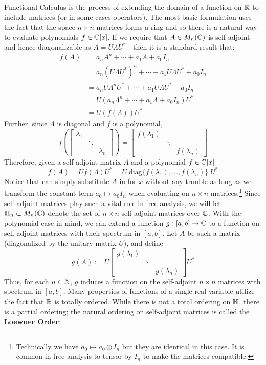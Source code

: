 Functional Calculus is the process of extending the domain of a function
on \(\mathbb{R}\) to include matrices (or in some cases operators). The most basic
formulation uses the fact that the space \(n \times n\) matrices forms a ring
and so there is a natural way to evaluate polynomials \(f \in \mathbb{C} [x]\). If we
require that $A \in M_n(\mathbb{C})$ is self-adjoint---and hence diagonalizable as
$A = U \Lambda U^*$---then it is a standard result that:
\begin{align*}
  f(A) &= a_nA^n + \cdots + a_1A + a_0 I_n \\
  &= a_n \left( U\Lambda U^* \right) ^n + \cdots + a_1 U\Lambda U^* + a_0 I_n \\
  &= a_n U\Lambda^n U^* + \cdots + a_1 U\Lambda U^* + a_0 I_n \\
  &= U \left( a_n\Lambda ^n + \cdots + a_1\Lambda + a_0 I_n \right) U^* \\
  &= U \left( f(\Lambda) \right) U^*
\end{align*}
Further, since \(\Lambda\) is diagonal and $f$ is a polynomial,
\[
  f \left( \begin{bmatrix} \lambda_1 &  &  \\  & \ddots &  \\  &  & \lambda_n \end{bmatrix}  \right)
  = \begin{bmatrix} f(\lambda_1) &  &  \\  & \ddots &  \\  &  & f(\lambda_n) \end{bmatrix}
\]
Therefore, given a self-adjoint matrix \(A\) and a polynomial \(f \in \mathbb{C} [x]\)
\[
  f(A) = Uf(\Lambda)U^* = U \;\text{diag}\{f(\lambda_{1}), \dots , f(\lambda_n)\} \; U^*
\]
Notice that can simply substitute \(A\) in for \(x\) without any trouble as long
as we transform the constant term \(a_0 \mapsto a_0I_n\) when evaluating on
\(n\times n\) matrices.\footnote{Technically we have
  \(a_0 \mapsto a_0 \otimes I_n\) but they are identical in this case. It is common in free
  analysis to tensor by \(I_n\) to make the matrices compatible.}
Since self-adjoint matrices play such a vital role in free analysis, we will let
\(\mathbb{H}_n \subset M_n(\mathbb{C})\) denote the set of \(n \times n\) self adjoint matrices over \(\mathbb{C} \).
With the polynomial case in mind, we can extend a function \(g: [a,b] \to \mathbb{C} \)
to a function on self adjoint matrices with their
spectrum in \([a,b]\). Let \(A\) be such a matrix (diagonalized by the unitary
matrix \(U\)), and define
\[
  g(A) := U
  \begin{bmatrix} g(\lambda_1) & &\\ &\ddots& \\ & & g(\lambda_n) \end{bmatrix}
  U^*
\]
Thus, for each \(n \in \mathbb{N} \), \(g\) induces a function on the self-adjoint
\(n \times n\) matrices with spectrum in \([a,b]\). Many properties of functions
of a single real variable utilize the fact that \(\mathbb{R} \) is totally ordered.
While there is not a total ordering on \(\mathbb{H} \), there is a partial ordering;
the natural ordering on self-adjoint matrices is called the
\textbf{Loewner Order}:

